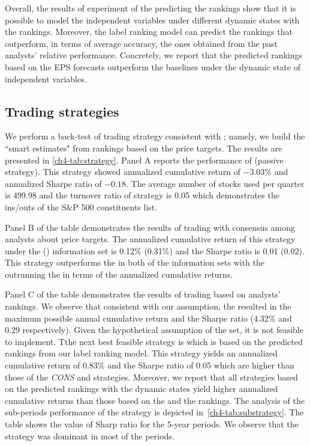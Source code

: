 \documentclass[12pt,a4paper]{article}\usepackage[]{graphicx}\usepackage[]{color}
\begin{document}
Overall, the results of experiment of the predicting the rankings show that it is possible to model the independent variables under different dynamic states with the rankings. Moreover, the label ranking model can predict the rankings that outperform, in terms of average accuracy, the ones  obtained from the past analysts' relative performance. Concretely, we report that the predicted rankings based on the EPS forecasts outperform the baselines under the \diff{} dynamic state of independent variables.




\subsection{Trading strategies}

We perform  a back-test of  trading  strategy consistent with  \cite{aiguzhinov2015a}; namely, we build the ``smart estimates" from rankings based on the  price targets. The results are presented in \ref{ch4-tab:strategy}. Panel A reports the performance of \Market{} (passive strategy). This strategy showed annualized cumulative return of \ensuremath{-3.03}\% and annualized Sharpe ratio of \ensuremath{-0.18}. The average number of stocks used per quarter is 499.98 and the turnover ratio of strategy is 0.05 which demonstrates the ins/outs of the S\&P 500 constituents list.

Panel B of the table demonstrates the results of trading with consensus among analysts about price targets. The annualized cumulative return of this strategy under the \recent{} () information set is 0.12\% (0.31\%) and the Sharpe ratio is  0.01 (0.02). This strategy outperforms the \Market{} in both of the information sets with the  outrunning the \naive{} in terms of the annualized cumulative returns.

Panel C of the table demonstrates the results of trading based on analysts' rankings. We observe that consistent with our assumption, the \true{} resulted in the maximum possible annual cumulative return and the Sharpe ratio (4.32\% and  0.29 respectively). Given the hypothetical assumption of the \true{} set, it is not feasible to implement. Tthe next best feasible strategy is
\diff{}
which is based on the predicted rankings from our label ranking model. This strategy yields an annualized cumulative return of 0.83\% and the Sharpe ratio of 0.05 which are higher than those of the \textit{CONS} and \Market{} strategies. Moreover, we report that all strategies based on the predicted rankings with the dynamic states yield higher annualized cumulative returns than those  based on the  \naive{} and the  rankings. The analysis of the sub-periods performance of the \diff{} strategy is depicted in~\ref{ch4-tab:substrategy}. The table shows the value of Sharp ratio for the 5-year periods. We observe that the \diff{} strategy was dominant in most of the periods.
\end{document}
